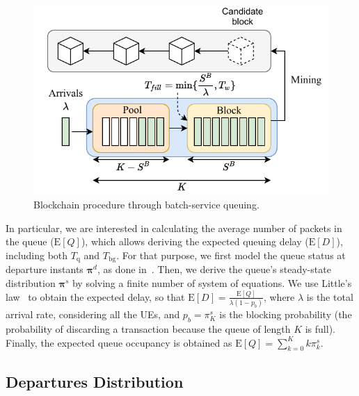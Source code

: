 \documentclass[conference]{IEEEtran}
\theoremstyle{definition}
\begin{document}
\begin{figure}[ht!]
\centering
\includegraphics[width=.9\linewidth]{batch_service_queue.pdf}
\caption{Blockchain procedure through batch-service queuing.}
\label{fig:batch_service_queue}
\end{figure}

In particular, we are interested in calculating the average number of packets in the queue ($\text{E}[Q]$), which allows deriving the expected queuing delay ($\text{E}[D]$), including both $T_\text{q}$ and $T_\text{bg}$. For that purpose, we first model the queue status at departure instants $\boldsymbol{\pi}^d$, as done in~\cite{bellalta2013performance}. Then, we derive the queue's steady-state distribution $\boldsymbol{\pi}^s$ by solving a finite number of system of equations. We use Little's law~\cite{shortle2018fundamentals} to obtain the expected delay, so that $\text{E}[D] = \frac{\text{E}[Q]}{\lambda(1-p_b)}$, where $\lambda$ is the total arrival rate, considering all the UEs, and $p_b = \pi_K^s$ is the blocking probability (the probability of discarding a transaction because the queue of length $K$ is full). Finally, the expected queue occupancy is obtained as $\text{E}[Q] = \sum_{k=0}^K k \pi_k^s$. %

\subsection{Departures Distribution}
\end{document}
